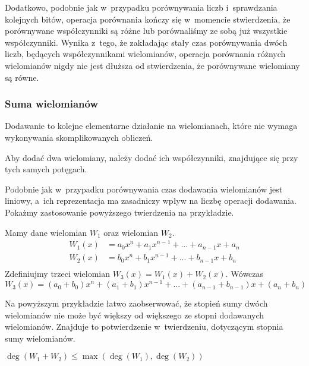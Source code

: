 Dodatkowo, podobnie jak w~przypadku porównywania liczb i~sprawdzania kolejnych bitów, operacja porównania kończy się w~momencie stwierdzenia, że porównywane współczynniki są różne lub porównaliśmy ze sobą już wszystkie współczynniki. Wynika z~tego, że zakładając stały czas porównywania dwóch liczb, będących współczynnikami wielomianów, operacja porównania różnych wielomianów nigdy nie jest dłuższa od stwierdzenia, że porównywane wielomiany są równe.

\subsubsection{Suma wielomianów}

Dodawanie to kolejne elementarne działanie na wielomianach, które nie wymaga wykonywania skomplikowanych obliczeń.

\begin{theorem}
	$ $\\
	Aby dodać dwa wielomiany, należy dodać ich współczynniki, znajdujące się przy tych samych potęgach.
\end{theorem}

Podobnie jak w~przypadku porównywania czas dodawania wielomianów jest liniowy, a~ich reprezentacja ma zasadniczy wpływ na liczbę operacji dodawania. Pokażmy zastosowanie powyższego twierdzenia na przykładzie.

\begin{example}
	$ $\\
	Mamy dane wielomian $W_1$ oraz wielomian $W_2$.
	\begin{equation*}
	\begin{split}
	W_1(x) &= a_0x^n + a_1x^{n-1} + ... + a_{n-1}x + a_n \\
	W_2(x) &= b_0x^n + b_1x^{n-1} + ... + b_{n-1}x + b_n \\
	\end{split}
	\end{equation*}
	Zdefiniujmy trzeci wielomian $W_3(x) = W_1(x) + W_2(x)$. Wówczas $W_3(x) = (a_0+b_0)x^n + (a_1+b_1)x^{n-1} + ... + (a_{n-1} + b_{n-1})x + (a_n + b_n)$
\end{example}

Na powyższym przykładzie łatwo zaobserwować, że stopień sumy dwóch wielomianów nie może być większy od większego ze stopni dodawanych wielomianów. Znajduje to potwierdzenie w~twierdzeniu, dotyczącym stopnia sumy wielomianów.

\begin{theorem}
	$ $\\
	$\deg(W_1 + W_2) \le \max(\deg(W_1),\deg (W_2))$
\end{theorem}

